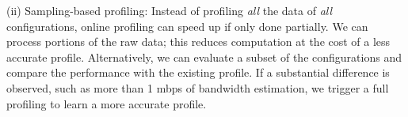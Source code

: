 (ii) Sampling-based profiling: Instead of profiling \textit{all} the data of
\textit{all} configurations, online profiling can speed up if only done
partially. We can process portions of the raw data; this reduces computation at
the cost of a less accurate profile. Alternatively, we can evaluate a subset of
the configurations and compare the performance with the existing profile. If a
substantial difference is observed, such as more than 1 mbps of bandwidth
estimation, we trigger a full profiling to learn a more accurate profile.

